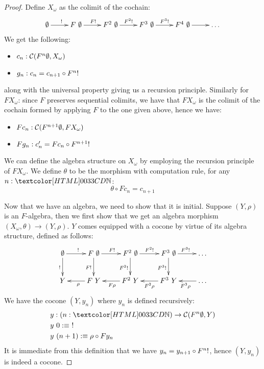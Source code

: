 \begin{proof}
  Define $X_\omega$ as the colimit of the cochain:
  $$
  \xymatrix{
    \initobj \ar[r]^{\inithom} 
    &F\ \initobj \ar[r]^{F \inithom} 
    &F^2\ \initobj \ar[r]^{F^2 \inithom} 
    &F^3\ \initobj \ar[r]^{F^3 \inithom} 
    &F^4\ \initobj \ar[r] 
    &\hdots
  }
  $$
  We get the following:
  \begin{itemize}
  \item $c_n : \mathcal{C}(F^n \emptyset , X_\omega)$
  \item $g_n : c_n = c_{n+1} \circ F^n !$
  \end{itemize}
  along with the universal property giving us a recursion
  principle. Similarly for $F X_\omega$: since $F$ preserves
  sequential colimits, we have that $F X_\omega$ is the colimit of the
  cochain formed by applying $F$ to the one given above, hence we have:
  \begin{itemize}
  \item $F c_n : \mathcal{C}(F^{n+1} \emptyset, F X_\omega)$
  \item $F g_n : c'_n = F c_n \circ F^{n+1} !$
  \end{itemize}
  We can define the algebra structure on $X_\omega$ by employing the
  recursion principle of $F X_\omega$. We define $\theta$ to be the
  morphism with computation rule, for any $n : \natty$:
  $$
  \theta \circ F c_n = c_{n+1}
  $$
  
  Now that we have an algebra, we need to show that it is
  initial. Suppose $(Y,\rho)$ is an $F$-algebra, then we first show
  that we get an algebra morphism $(X_\omega , \theta) \to
  (Y,\rho)$.
  $Y$ comes equipped with a cocone by virtue of its algebra structure,
  defined as follows:
  $$
  \xymatrix{
    \initobj \ar[r]^{\inithom}
    \ar[d]_{\inithom}
    &F\ \initobj \ar[r]^{F \inithom} 
    \ar[d]_{F \inithom}
    &F^2\ \initobj \ar[r]^{F^2 \inithom} 
    \ar[d]_{F^2 \inithom}
    &F^3\ \initobj \ar[r]^{F^3 \inithom} 
    \ar[d]_{F^3 \inithom}
    &\hdots
    \\
    Y
    &F\ Y \ar[l]^{\rho} 
    &F^2\ Y \ar[l]^{F \rho} 
    &F^3\ Y \ar[l]^{F^2 \rho} 
    &\hdots \ar[l]^{F^3 \rho}  
  }
  $$
  We have the cocone $(Y,y_n)$ where $y_n$ is defined recursively:
  \begin{align*}
    &y : (n : \natty) \to \Cc(F^n \initobj, Y) \\
    &y\ 0 \ddefeq\ \inithom \\
    &y\ (n+1) \ddefeq \rho \circ F y_n
  \end{align*}
  It is immediate from this definition that we have
  $y_n = y_{n+1} \circ F^n !$, hence $(Y,y_n)$ is indeed a
  cocone.


\end{proof}
